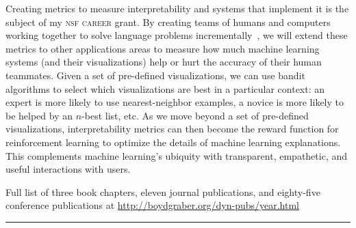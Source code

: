 \documentclass[11pt]{amsart}
\begin{document}
Creating metrics to measure interpretability and systems that implement it is
the subject of my \textsc{nsf career} grant. By creating teams of humans and
computers working together to solve language problems
incrementally~\cite{feng-19}, we will extend these metrics to other
applications areas to measure how much machine learning systems (and their
visualizations) help or hurt the accuracy of their human teammates. Given a set
of pre-defined visualizations, we can use bandit algorithms to select which
visualizations are best in a particular context: an expert is more likely to
use nearest-neighbor examples, a novice is more likely to be helped by an
$n$-best list, etc. As we move beyond a set of pre-defined visualizations,
interpretability metrics can then become the reward function for reinforcement
learning to optimize the details of machine learning explanations. This
complements machine learning's ubiquity with transparent, empathetic, and
useful interactions with users.





\clearpage




\begin{center}
Full list of  three book chapters, eleven journal publications, and eighty-five conference
publications at \url{http://boydgraber.org/dyn-pubs/year.html}
\end{center}

%

\noindent\rule{4cm}{0.4pt}
\end{document}
